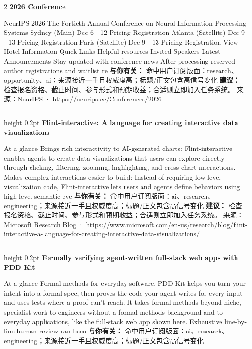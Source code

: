 \documentclass[10.5pt]{ctexart}
\begin{document}
\begin{multicols}{2}
{\large\bfseries 2026 Conference}\par
NeurIPS 2026 The Fortieth Annual Conference on Neural Information Processing Systems Sydney (Main) Dec 6 - 12 Pricing Registration Atlanta (Satellite) Dec 9 - 13 Pricing Registration Paris (Satellite) Dec 9 - 13 Pricing Registration View Hotel Information Quick Links Helpful resources Invited Speakers Latest Announcements Stay updated with conference news After processing reserved author registrations and waitlist re
\textbf{与你有关：} 命中用户订阅版面：research、opportunity、ai；来源接近一手且权威度高；标题/正文包含高信号变化
\textbf{建议：} 检查报名资格、截止时间、参与形式和预期收益；合适则立即加入任务系统。
{\footnotesize\color{ormuted} 来源：NeurIPS · \url{https://neurips.cc/Conferences/2026}}
\vspace{2mm}
\hrule height 0.2pt
\vspace{2mm}
{\large\bfseries Flint-interactive: A language for creating interactive data visualizations}\par
At a glance Brings rich interactivity to AI-generated charts: Flint-interactive enables agents to create data visualizations that users can explore directly through clicking, filtering, zooming, highlighting, and cross-chart interactions. Makes complex interactions easier to build: Instead of requiring low-level visualization code, Flint-interactive lets users and agents define behaviors using high-level semantic eve
\textbf{与你有关：} 命中用户订阅版面：ai、research、engineering；来源接近一手且权威度高；标题/正文包含高信号变化
\textbf{建议：} 检查报名资格、截止时间、参与形式和预期收益；合适则立即加入任务系统。
{\footnotesize\color{ormuted} 来源：Microsoft Research Blog · \url{https://www.microsoft.com/en-us/research/blog/flint-interactive-a-language-for-creating-interactive-data-visualizations/}}
\vspace{2mm}
\hrule height 0.2pt
\vspace{2mm}
{\large\bfseries Formally verifying agent-written full-stack web apps with PDD Kit}\par
At a glance Formal methods for everyday software. PDD Kit helps you turn your intent into a formal spec, then proves the code your agent writes for every input and uses tests where a proof can’t reach. It takes formal methods beyond niche, specialist work to engineers without a formal methods background and to everyday applications, like the full-stack web app shown here. Exhaustive line-by-line human review can beco
\textbf{与你有关：} 命中用户订阅版面：ai、research、engineering；来源接近一手且权威度高；标题/正文包含高信号变化

\end{multicols}
\end{document}
